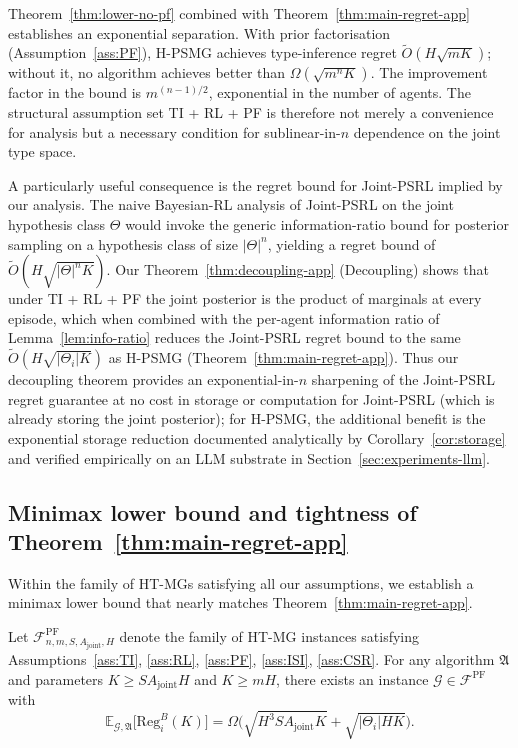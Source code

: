 Theorem~\ref{thm:lower-no-pf} combined with Theorem~\ref{thm:main-regret-app} establishes an exponential separation. With prior factorisation (Assumption~\ref{ass:PF}), H-PSMG achieves type-inference regret $\tilde O(H\sqrt{m K})$; without it, no algorithm achieves better than $\Omega(\sqrt{m^n K})$. The improvement factor in the bound is $m^{(n-1)/2}$, exponential in the number of agents. The structural assumption set TI + RL + PF is therefore not merely a convenience for analysis but a necessary condition for sublinear-in-$n$ dependence on the joint type space.

\begin{remark}
A particularly useful consequence is the regret bound for Joint-PSRL implied by our analysis. The naive Bayesian-RL analysis of Joint-PSRL on the joint hypothesis class $\Theta$ would invoke the generic information-ratio bound for posterior sampling on a hypothesis class of size $|\Theta|^n$, yielding a regret bound of $\tilde O(H\sqrt{|\Theta|^n K})$. Our Theorem~\ref{thm:decoupling-app} (Decoupling) shows that under TI + RL + PF the joint posterior is the product of marginals at every episode, which when combined with the per-agent information ratio of Lemma~\ref{lem:info-ratio} reduces the Joint-PSRL regret bound to the same $\tilde O(H\sqrt{|\Theta_i| K})$ as H-PSMG (Theorem~\ref{thm:main-regret-app}). Thus our decoupling theorem provides an exponential-in-$n$ sharpening of the Joint-PSRL regret guarantee at no cost in storage or computation for Joint-PSRL (which is already storing the joint posterior); for H-PSMG, the additional benefit is the exponential storage reduction documented analytically by Corollary~\ref{cor:storage} and verified empirically on an LLM substrate in Section~\ref{sec:experiments-llm}.
\end{remark}

\subsection{Minimax lower bound and tightness of Theorem~\ref{thm:main-regret-app}}
\label{sec:lower-bound-matching}

Within the family of HT-MGs satisfying all our assumptions, we establish a minimax lower bound that nearly matches Theorem~\ref{thm:main-regret-app}.

\begin{theorem}
\label{thm:lower-matching}
Let $\mathcal{F}^{\mathrm{PF}}_{n, m, S, A_{\mathrm{joint}}, H}$ denote the family of HT-MG instances satisfying Assumptions~\ref{ass:TI}, \ref{ass:RL}, \ref{ass:PF}, \ref{ass:ISI}, \ref{ass:CSR}. For any algorithm $\mathfrak{A}$ and parameters $K \geq SA_{\mathrm{joint}}H$ and $K \geq mH$, there exists an instance $\mathcal{G} \in \mathcal{F}^{\mathrm{PF}}$ with
\begin{equation}
\mathbb{E}_{\mathcal{G}, \mathfrak{A}}\big[\mathrm{Reg}_i^B(K)\big] = \Omega\Big(\sqrt{H^3 S A_{\mathrm{joint}} K} + \sqrt{|\Theta_i| H K}\Big).
\end{equation}
\end{theorem}

